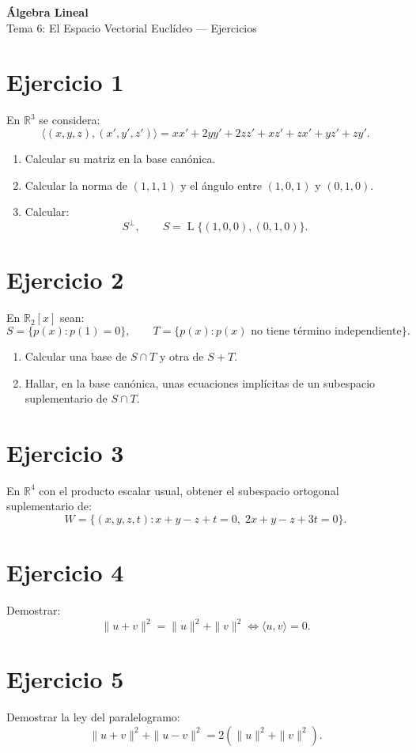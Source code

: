 \documentclass[11pt,a4paper]{article}
\newcommand{\R}{\mathbb{R}}
\newcommand{\Span}{\operatorname{L}}
\begin{document}
\begin{center}
{\LARGE\bfseries Álgebra Lineal}\\[0.4em]
{\Large Tema 6: El Espacio Vectorial Euclídeo --- Ejercicios}
\end{center}

\section{Ejercicio 1}
En $\R^3$ se considera:
\[
\langle(x,y,z),(x',y',z')\rangle
=
xx'+2yy'+2zz'+xz'+zx'+yz'+zy'.
\]
\begin{enumerate}[label=\alph*)]
\item Calcular su matriz en la base canónica.
\item Calcular la norma de $(1,1,1)$ y el ángulo entre $(1,0,1)$ y $(0,1,0)$.
\item Calcular:
\[
S^\perp,
\qquad
S=\Span\{(1,0,0),(0,1,0)\}.
\]
\end{enumerate}

\section{Ejercicio 2}
En $\R_2[x]$ sean:
\[
S=\{p(x):p(1)=0\},
\qquad
T=\{p(x):p(x)\text{ no tiene término independiente}\}.
\]
\begin{enumerate}[label=\alph*)]
\item Calcular una base de $S\cap T$ y otra de $S+T$.
\item Hallar, en la base canónica, unas ecuaciones implícitas de un subespacio suplementario de $S\cap T$.
\end{enumerate}

\section{Ejercicio 3}
En $\R^4$ con el producto escalar usual, obtener el subespacio ortogonal suplementario de:
\[
W=
\{(x,y,z,t):
x+y-z+t=0,\;
2x+y-z+3t=0\}.
\]

\section{Ejercicio 4}
Demostrar:
\[
\|u+v\|^2
=
\|u\|^2+\|v\|^2
\iff
\langle u,v\rangle=0.
\]

\section{Ejercicio 5}
Demostrar la ley del paralelogramo:
\[
\|u+v\|^2+\|u-v\|^2
=
2\left(\|u\|^2+\|v\|^2\right).
\]
\end{document}

